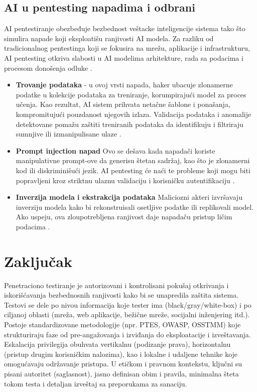 \documentclass[a4paper,12pt]{article}
\begin{document}
\subsection{AI u pentesting napadima i odbrani}
AI pentestiranje obezbeđuje bezbednost veštacke inteligencije sistema tako što simulira napade koji eksploatišu ranjivosti AI modela. Za razliku od tradicionalnog pentestinga koji se fokusira na mrežu, aplikacije i infrastrukturu, AI pentesting otkriva slabosti u AI modelima arhitekture, rada sa podacima i procesom donošenja odluke \cite{ai-pentesting}.
\begin{itemize}
  \item \textbf{Trovanje podataka} - u ovoj vrsti napada, haker ubacuje zlonamerne podatke u kolekcije podataka za treniranje, korumpirajući model za proces učenja. Kao rezultat, AI sistem prihvata netačne šablone i ponašanja, kompromitujući pouzdanost njegovih izlaza. Validacija podataka i anomalije detektovane pomažu zaštiti treniranih podataka da identifikuju i filtriraju sumnjive ili izmanipulisane ulaze \cite{ai-pentesting}.
  \item \textbf{Prompt injection napad}
  Ovo se dešava kada napadači koriste manipulativne prompt-ove da generisu štetan sadržaj, kao što je zlonamerni kod ili diskriminišući jezik. AI pentesting će naći te probleme koji mogu biti popravljeni kroz striktnu ulaznu validaciju i korisničku autentifikaciju \cite{ai-pentesting}.
  \item \textbf{Inverzija modela i ekstrakcija podataka}
  Maliciozni akteri izvršavaju inverziju modela kako bi rekonstruisali osetljive podatke ili replikovali model. Ako uspeju, ova zloupotrebljena ranjivost daje napadaču pristup ličim podacima \cite{ai-pentesting}.
\end{itemize}
\newpage
\section{Zaključak}
Penetraciono testiranje je autorizovani i kontrolisani pokušaj otkrivanja i iskorišćavanja bezbednosnih ranjivosti kako bi se unapredila zaštita sistema. Testovi se dele po nivou informacija koje tester ima (black/gray/white-box) i po ciljanoj oblasti (mreža, web aplikacije, bežične mreže, socijalni inženjering itd.). Postoje standardizovane metodologije (npr. PTES, OWASP, OSSTMM) koje strukturiraju faze od pre-angažovanja i izviđanja do eksploatacije i izveštavanja. Eskalacija privilegija obuhvata vertikalnu (podizanje prava), horizontalnu (pristup drugim korisničkim nalozima), kao i lokalne i udaljene tehnike koje omogućavaju održavanje pristupa. U etičkom i pravnom kontekstu, ključni su pisani autoritet (saglasnost), jasno definisan obim i pravila, minimalna šteta tokom testa i detaljan izveštaj sa preporukama za sanaciju.
\newpage

\AtNextBibliography{\small}
\printbibliography
\end{document}

